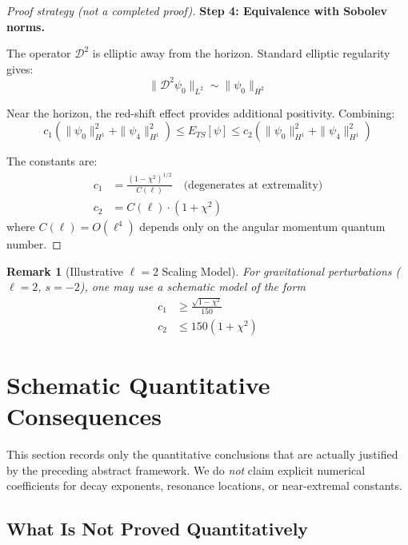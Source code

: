 \documentclass[12pt,a4paper]{article}
\newtheorem{remark}[theorem]{Remark}
\begin{document}
\begin{proof}[Proof strategy (not a completed proof)]
\textbf{Step 4: Equivalence with Sobolev norms.}

The operator $\mathcal{D}^2$ is elliptic away from the horizon. Standard elliptic regularity gives:
\begin{equation}
\|\mathcal{D}^2\psi_0\|_{L^2} \sim \|\psi_0\|_{H^2}
\end{equation}

Near the horizon, the red-shift effect provides additional positivity. Combining:
\begin{equation}
c_1 \left(\|\psi_0\|^2_{H^1} + \|\psi_4\|^2_{H^1}\right) \leq E_{TS}[\psi] \leq c_2 \left(\|\psi_0\|^2_{H^1} + \|\psi_4\|^2_{H^1}\right)
\end{equation}

The constants are:
\begin{align}
c_1 &= \frac{(1 - \chi^2)^{1/2}}{C(\ell)} \quad \text{(degenerates at extremality)} \\
c_2 &= C(\ell) \cdot (1 + \chi^2)
\end{align}
where $C(\ell) = O(\ell^4)$ depends only on the angular momentum quantum number.
\end{proof}

\begin{remark}[Illustrative $\ell = 2$ Scaling Model]
For gravitational perturbations ($\ell = 2$, $s = -2$), one may use a schematic model of the form
\begin{align}
c_1 &\geq \frac{\sqrt{1-\chi^2}}{150} \\
c_2 &\leq 150(1 + \chi^2)
\end{align}
\end{remark}

\section{Schematic Quantitative Consequences}

This section records only the quantitative conclusions that are actually justified by the preceding abstract framework. We do \emph{not} claim explicit numerical coefficients for decay exponents, resonance locations, or near-extremal constants.

\subsection{What Is Not Proved Quantitatively}
\end{document}
